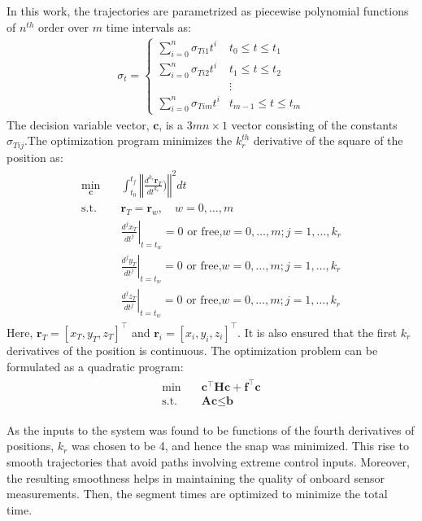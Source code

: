 In this work, the trajectories are parametrized as piecewise polynomial functions of $n^{th}$ order over $m$ time intervals as:
\begin{align}
  \sigma_{t} =
    \begin{cases}
      \sum_{i=0}^n \sigma_{Ti1}t^i& t_0\leq t\leq t_1\\
      \sum_{i=0}^n \sigma_{Ti2}t^i& t_1\leq t\leq t_2\\
      &\vdots\\
      \sum_{i=0}^n \sigma_{Tim}t^i& t_{m-1}\leq t\leq t_m
    \end{cases} 
\end{align}
The decision variable vector, $\textbf{c}$, is a $3mn\times 1$ vector consisting of the constants $\sigma_{T{ij}}$.The optimization program minimizes the $k_r^{th}$ derivative of the square of the position as:
\begin{align}
\begin{split}
\min_{\textbf{c}} \quad & \int_{t_0}^{t_f} \left\Vert\frac{d^{k_r}\textbf{r}_T}{dt^{k_r}})\right\Vert^2 dt\\
\textrm{s.t.} \quad & \textbf{r}_{T}=\textbf{r}_w, \quad w=0,\ldots,m\\
  &\left.\frac{d^j x_T}{dt^j}\right\rvert_{t=t_w}=0\text{ or free,}w=0,\ldots,m;j=1,\ldots,k_r\\
  &\left.\frac{d^j y_T}{dt^j}\right\rvert_{t=t_w}=0\text{ or free,}w=0,\ldots,m;j=1,\ldots,k_r\\
  &\left.\frac{d^j z_T}{dt^j}\right\rvert_{t=t_w}=0\text{ or free,}w=0,\ldots,m;j=1,\ldots,k_r
\end{split}
\end{align}
Here, $\textbf{r}_T=[x_T,y_T,z_T]^\top$ and $\textbf{r}_i=[x_i,y_i,z_i]^\top$. It is also ensured that the first $k_r$ derivatives of the position is continuous. The optimization problem can be formulated as a quadratic program:
\begin{align}
\begin{split}
\min \quad & \textbf{c}^\top \textbf{H} \textbf{c} + \textbf{f}^\top\textbf{c} \\
\textrm{s.t.} \quad &\textbf{Ac}\leq \textbf{b}
\end{split}
\end{align}

As the inputs to the system was found to be functions of the fourth derivatives of positions, $k_r$ was chosen to be 4, and hence the snap was minimized. This rise to smooth trajectories that avoid paths involving extreme control inputs. Moreover, the resulting smoothness helps in maintaining the quality of onboard sensor measurements. Then, the segment times are optimized to minimize the total time. 

